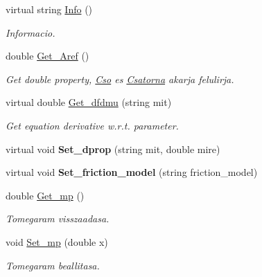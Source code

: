 \begin{DoxyCompactItemize}
virtual string \hyperlink{class_agelem_a2e6c4688cdbdf17c6d3bde0c6c08ff49}{Info} ()
\begin{DoxyCompactList}\small\item\em Informacio. \end{DoxyCompactList}\item 
\mbox{\label{class_agelem_a47b441de19cf771363bf25e3f65fc228}} 
double \hyperlink{class_agelem_a47b441de19cf771363bf25e3f65fc228}{Get\+\_\+\+Aref} ()
\begin{DoxyCompactList}\small\item\em Get double property, \hyperlink{class_cso}{Cso} es \hyperlink{class_csatorna}{Csatorna} akarja felulirja. \end{DoxyCompactList}\item 
\mbox{\label{class_agelem_a47c5952bbfa4ca32910f361ee47f6ae8}} 
virtual double \hyperlink{class_agelem_a47c5952bbfa4ca32910f361ee47f6ae8}{Get\+\_\+dfdmu} (string mit)
\begin{DoxyCompactList}\small\item\em Get equation derivative w.\+r.\+t. parameter. \end{DoxyCompactList}\item 
\mbox{\label{class_agelem_aa830fcc840b21486fdecd40712f3373e}} 
virtual void {\bfseries Set\+\_\+dprop} (string mit, double mire)
\item 
\mbox{\label{class_agelem_a1285244f5e03d7db2092a2e5c14df288}} 
virtual void {\bfseries Set\+\_\+friction\+\_\+model} (string friction\+\_\+model)
\item 
\mbox{\label{class_agelem_ab1bd05d137565c3a964e31598f8e2e71}} 
double \hyperlink{class_agelem_ab1bd05d137565c3a964e31598f8e2e71}{Get\+\_\+mp} ()
\begin{DoxyCompactList}\small\item\em Tomegaram visszaadasa. \end{DoxyCompactList}\item 
\mbox{\label{class_agelem_a7d72a3740ccae5c739eaa3c7b2697c2c}} 
void \hyperlink{class_agelem_a7d72a3740ccae5c739eaa3c7b2697c2c}{Set\+\_\+mp} (double x)
\begin{DoxyCompactList}\small\item\em Tomegaram beallitasa. \end{DoxyCompactList}\item 

\end{DoxyCompactItemize}

